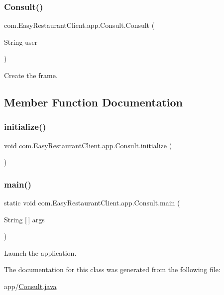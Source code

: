 \subsubsection{\texorpdfstring{Consult()}{Consult()}}
{\footnotesize\ttfamily com.\+Easy\+Restaurant\+Client.\+app.\+Consult.\+Consult (\begin{DoxyParamCaption}\item[{String}]{user }\end{DoxyParamCaption})}

Create the frame. 

\subsection{Member Function Documentation}
\mbox{\label{classcom_1_1_easy_restaurant_client_1_1app_1_1_consult_a1323f2e42263ed30e6195a7460873074}} 
\subsubsection{\texorpdfstring{initialize()}{initialize()}}
{\footnotesize\ttfamily void com.\+Easy\+Restaurant\+Client.\+app.\+Consult.\+initialize (\begin{DoxyParamCaption}{ }\end{DoxyParamCaption})}

\mbox{\label{classcom_1_1_easy_restaurant_client_1_1app_1_1_consult_acc89a312a5111b16064df1a3b042f59b}} 
\subsubsection{\texorpdfstring{main()}{main()}}
{\footnotesize\ttfamily static void com.\+Easy\+Restaurant\+Client.\+app.\+Consult.\+main (\begin{DoxyParamCaption}\item[{String \mbox{[}$\,$\mbox{]}}]{args }\end{DoxyParamCaption})\hspace{0.3cm}{\ttfamily [static]}}

Launch the application. 

The documentation for this class was generated from the following file\+:\begin{DoxyCompactItemize}
\item 
app/\mbox{\hyperlink{_consult_8java}{Consult.\+java}}\end{DoxyCompactItemize}
